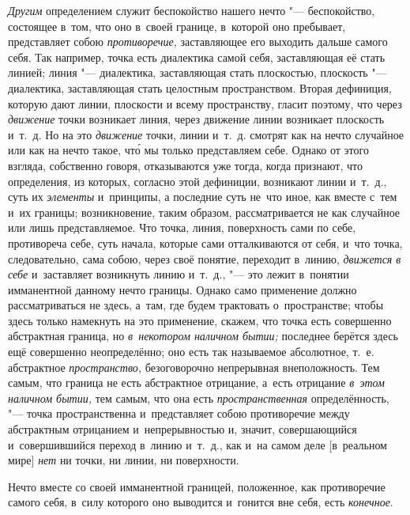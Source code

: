\begin{midsloppypar}
{\em Другим} определением служит беспокойство нашего
нечто "--- беспокойство, состоящее в~том, что оно в~своей границе, в~которой
оно пребывает, представляет собою {\em противоречие,}
заставляющее его выходить дальше самого себя. Так например, точка есть
диалектика самой себя, заставляющая её стать линией; линия "--- диалектика,
заставляющая стать плоскостью, плоскость "--- диалектика, заставляющая стать
целостным пространством. Вторая дефиниция, которую дают линии, плоскости и
всему пространству, гласит поэтому, что через
{\em движение} точки возникает линия, через движение
линии возникает плоскость и~т.~д. Но на это
{\em движение} точки, линии и~т.~д. смотрят как на
нечто случайное или как на нечто такое, чт\'{о} мы только представляем себе.
Однако от этого взгляда, собственно говоря, отказываются уже тогда, когда
признают, что определения, из которых, согласно этой дефиниции, возникают
линии и~т.~д., суть их {\em элементы} и~принципы, а
последние суть не~что иное, как вместе с~тем и~их границы; возникновение,
таким образом, рассматривается не как случайное или лишь представляемое.
Что точка, линия, поверхность сами по себе, противореча себе, суть начала,
которые сами отталкиваются от себя, и~что точка, следовательно, сама собою,
через своё понятие, переходит в~линию, {\em движется в
себе} и~заставляет возникнуть линию и~т.~д., "--- это лежит в~понятии
имманентной данному нечто границы. Однако само применение должно
рассматриваться не здесь, а~там, где будем трактовать о~пространстве; чтобы
здесь только намекнуть на это применение, скажем, что точка есть совершенно
абстрактная граница, но {\em в~некотором наличном
бытии;} последнее берётся здесь ещё совершенно неопределённо; оно есть так
называемое абсолютное, т.~е. абстрактное
{\em пространство,} безоговорочно непрерывная
внеположность. Тем самым, что граница не есть абстрактное отрицание, а~есть
отрицание {\em в~этом наличном бытии,} тем самым, что
она есть {\em пространственная} определённость, "--- точка
пространственна и~представляет собою противоречие между абстрактным
отрицанием и~непрерывностью и, значит, совершающийся и~совершившийся
переход в~линию и~т.~д., как и~на самом деле [в~реальном мире]
{\em нет} ни точки, ни линии, ни поверхности.
\end{midsloppypar}

Нечто вместе со своей имманентной границей, положенное, как противоречие
самого себя, в~силу которого оно выводится и~гонится вне себя, есть
{\em конечное}.


